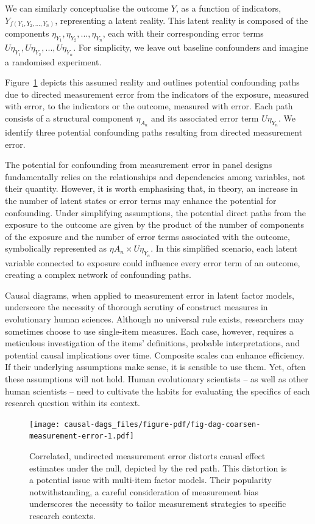 \documentclass[
  singlecolumn]{article}
\begin{document}
We can similarly conceptualise the outcome \(Y\), as a function of
indicators, \(Y_{f(Y_1, Y_2, ..., Y_n)}\), representing a latent
reality. This latent reality is composed of the components
\(\eta_{Y_1}, \eta_{Y_2}, ..., \eta_{Y_n}\), each with their
corresponding error terms
\(U\eta_{Y_1}, U\eta_{Y_2}, ..., U\eta_{Y_n}\). For simplicity, we leave
out baseline confounders and imagine a randomised experiment.

Figure~\ref{fig-dag-coarsen-measurement-error} depicts this assumed
reality and outlines potential confounding paths due to directed
measurement error from the indicators of the exposure, measured with
error, to the indicators or the outcome, measured with error. Each path
consists of a structural component \(\eta_{A_n}\) and its associated
error term \(U\eta_{Y_n}\). We identify three potential confounding
paths resulting from directed measurement error.

The potential for confounding from measurement error in panel designs
fundamentally relies on the relationships and dependencies among
variables, not their quantity. However, it is worth emphasising that, in
theory, an increase in the number of latent states or error terms may
enhance the potential for confounding. Under simplifying assumptions,
the potential direct paths from the exposure to the outcome are given by
the product of the number of components of the exposure and the number
of error terms associated with the outcome, symbolically represented as
\(\eta A_n \times U\eta_{Y_n}\). In this simplified scenario, each
latent variable connected to exposure could influence every error term
of an outcome, creating a complex network of confounding paths.

Causal diagrams, when applied to measurement error in latent factor
models, underscore the necessity of thorough scrutiny of construct
measures in evolutionary human sciences. Although no universal rule
exists, researchers may sometimes choose to use single-item measures.
Each case, however, requires a meticulous investigation of the items'
definitions, probable interpretations, and potential causal implications
over time. Composite scales can enhance efficiency. If their underlying
assumptions make sense, it is sensible to use them. Yet, often these
assumptions will not hold. Human evolutionary scientists -- as well as
other human scientists -- need to cultivate the habits for evaluating
the specifics of each research question within its context.

\begin{figure}

{\centering \texttt{[image: causal-dags\_files/figure-pdf/fig-dag-coarsen-measurement-error-1.pdf]}

}

\caption{\label{fig-dag-coarsen-measurement-error}Correlated, undirected
measurement error distorts causal effect estimates under the null,
depicted by the red path. This distortion is a potential issue with
multi-item factor models. Their popularity notwithstanding, a careful
consideration of measurement bias underscores the necessity to tailor
measurement strategies to specific research contexts.}

\end{figure}
\end{document}
